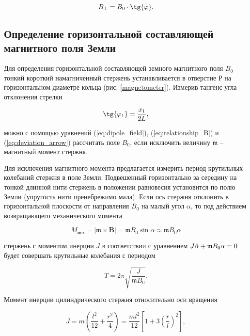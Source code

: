 \documentclass[a4paper, 12pt]{article}
\begin{document}
    \begin{equation}
        B_\perp = B_0 \cdot \tg{\varphi}.
        \label{eq:relationship_B}
    \end{equation}

    \subsection{Определение горизонтальной составляющей магнитного поля Земли}

    Для определения горизонтальной составляющей земного магнитного поля $B_0$ тонкий короткий намагниченный стержень устанавливается в отверстие Р на горизонтальном диаметре кольца (рис. \ref{magnetometer}). Измерив тангенс угла отклонения стрелки

    \begin{equation}
        \tg{\varphi_1} = \frac{x_1}{2L},
        \label{eq:deviation_arrow}
    \end{equation}
    
    можно с помощью уравнений (\ref{eq:dipole_field}), (\ref{eq:relationship_B}) и (\ref{eq:deviation_arrow}) рассчитать поле $B_0$, если исключить величину $\mathfrak{m}$ -- магнитный момент стержня.
    
    Для исключения магнитного момента предлагается измерить период крутильных колебаний стержня в поле Земли. Подвешенный горизонтально за середину на тонкой длинной нити стержень в положении равновесия установится по полю Земли (упругость нити пренебрежимо мала). Если ось стержня отклонить в горизонтальной плоскости от направления $B_0$ на малый угол $\alpha$, то под действием возвращающего механического момента

    \begin{equation}
        M_\text{мех} = \lvert \bm{\mathfrak{m}} \times \bm{B} \rvert = \mathfrak{m} B_0 \sin{\alpha} \approx \mathfrak{m} B_0 \alpha
    \end{equation}
    
    стержень с моментом инерции $J$ в соответствии с уравнением $J \Ddot{\alpha} + \mathfrak{m} B_0 \alpha = 0$ будет совершать крутильные колебания с периодом

    \begin{equation}
        T = 2\pi \sqrt{\frac{J}{\mathfrak{m} B_0}}.
    \end{equation}

    Момент инерции цилиндрического стержня относительно оси вращения

    \begin{equation}
        J = m \left( \frac{l^2}{12} + \frac{r^2}{4} \right) = \frac{ml^2}{12} \left[1 + 3\left( \frac{r}{l}\right)^2 \right],
    \end{equation}
    
\end{document}
